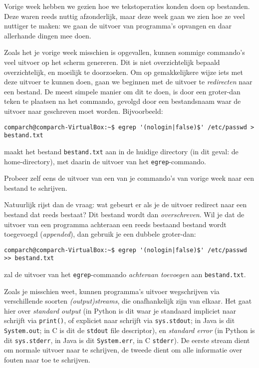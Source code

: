 \documentclass[a4paper,twoside,openany]{memoir}
\begin{document}
Vorige week hebben we gezien hoe we tekstoperaties konden doen op bestanden.
Deze waren reeds nuttig afzonderlijk, maar deze week gaan we zien hoe ze veel
nuttiger te maken: we gaan de uitvoer van programma's opvangen en daar
allerhande dingen mee doen.

Zoals het je vorige week misschien is opgevallen, kunnen sommige commando's veel
uitvoer op het scherm genereren. Dit is niet overzichtelijk bepaald
overzichtelijk, en moeilijk te doorzoeken. Om op gemakkelijkere wijze iets met
deze uitvoer te kunnen doen, gaan we beginnen met de uitvoer te
\emph{redirecten} naar een bestand. De meest simpele manier om dit te doen, is
door een groter-dan teken te plaatsen na het commando, gevolgd door een
bestandsnaam waar de uitvoer naar geschreven moet worden. Bijvoorbeeld:

\begin{verbatim}
comparch@comparch-VirtualBox:~$ egrep '(nologin|false)$' /etc/passwd > bestand.txt
\end{verbatim}

maakt het bestand \verb!bestand.txt! aan in de huidige directory (in dit geval:
de home-directory), met daarin de uitvoer van het \verb!egrep!-commando.

Probeer zelf eens de uitvoer van een van je commando's van vorige week naar een
bestand te schrijven.

Natuurlijk rijst dan de vraag: wat gebeurt er als je de uitvoer redirect naar
een bestand dat reeds bestaat? Dit bestand wordt dan \emph{overschreven}. Wil je
dat de uitvoer van een programma achteraan een reeds bestaand bestand wordt
toegevoegd (\emph{appended}), dan gebruik je een dubbele groter-dan:

\begin{verbatim}
comparch@comparch-VirtualBox:~$ egrep '(nologin|false)$' /etc/passwd >> bestand.txt
\end{verbatim}

zal de uitvoer van het \verb!egrep!-commando \emph{achteraan toevoegen} aan
\verb!bestand.txt!.

Zoals je misschien weet, kunnen programma's uitvoer wegschrijven via
verschillende soorten \emph{(output)streams}, die onafhankelijk zijn van elkaar.
Het gaat hier over \emph{standard output} (in Python is dit waar je standaard
impliciet naar schrijft via \verb!print()!, of expliciet naar schrijft via
\verb!sys.stdout!; in Java is dit \verb!System.out!; in C is dit de \verb!stdout!
file descriptor), en \emph{standard error} (in Python is dit \verb!sys.stderr!,
in Java is dit \verb!System.err!, in C \verb!stderr!). De
eerste stream dient om normale uitvoer naar te schrijven, de tweede dient om
alle informatie over fouten naar toe te schrijven.
\end{document}

